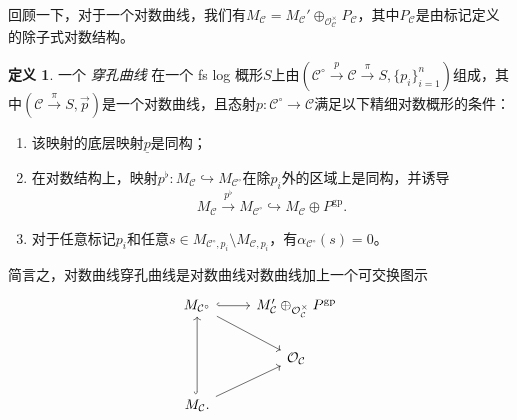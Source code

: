 \documentclass{amsart}
\theoremstyle{definition}
\newtheorem{defn}[thm]{定义}
\theoremstyle{remark}
\theoremstyle{plain}
\theoremstyle{definition}
\theoremstyle{remark}
\newcommand{\mc}[1]{\mathcal{#1}}
\newcommand{\mr}[1]{\mathrm{#1}}
\newcommand{\on}[1]{\operatorname{#1}}
\newcommand{\ul}[1]{\underline{#1}}
\newcommand{\1}{\mathbf{1}}
\newcommand{\2}{\mathbf{2}}
\newcommand{\3}{\mathbf{3}}
\begin{document}
回顾一下，对于一个对数曲线，我们有\(M_{\mc{C}} = M_{\mc{C}}' \oplus_{\mc{O}_{\mc{C}}^{\times}} P_{\mc{C}}\)，其中\(P_{\mc{C}}\)是由标记定义的除子式对数结构。

\begin{defn}
    一个 \textit{穿孔曲线} 在一个 fs log 概形\(S\)上由\((\mc{C}^{\circ} \xrightarrow{p} \mc{C} \xrightarrow{\pi} S, \{p_i\}_{i=1}^n)\)组成，其中\((\mc{C} \xrightarrow{\pi} S, \vec{p})\)是一个对数曲线，且态射\(p \colon \mc{C}^{\circ} \to \mc{C}\)满足以下精细对数概形的条件：
    \begin{enumerate}
        \item 该映射的底层映射\(\ul{p}\)是同构；
        \item 在对数结构上，映射\(p^{\flat} \colon M_{\mc{C}} \hookrightarrow M_{\mc{C}^{\circ}}\)在除\(p_i\)外的区域上是同构，并诱导
            \[ M_{\mc{C}} \xrightarrow{p^{\flat}} M_{\mc{C}^{\circ}} \hookrightarrow M_{\mc{C}} \oplus P^{\mr{gp}}. \]
        \item 对于任意标记\(p_i\)和任意\(s \in M_{\mc{C}^{\circ}, p_i} \setminus M_{\mc{C}, p_i}\)，有\(\alpha_{\mc{C}^{\circ}}(s) = 0\)。
    \end{enumerate}
\end{defn}

简言之，对数曲线穿孔曲线是对数曲线对数曲线加上一个可交换图示
\begin{equation*}
\begin{tikzcd}
    M_{\mc{C}^{\circ}} \ar{dr} \ar[hookrightarrow]{r} & M_{\mc{C}}' \oplus_{\mc{O}_{\mc{C}}^{\times}} P^{\on{gp}} \\
    & \mc{O}_{\mc{C}} \\
    M_{\mc{C}} \ar[hookrightarrow]{uu} \ar{ur}.
\end{tikzcd}
\end{equation*}
\end{document}
